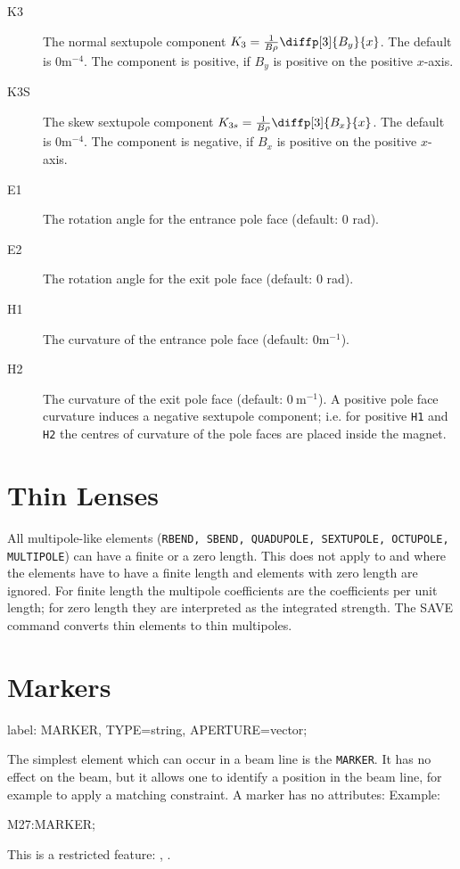 \begin{description}
\item[K3]
  The normal sextupole component
  $K_3=\frac{1}{B \rho}\diffp[3]{B_y}{x}$.
  The default is $0 \mathrm{m}^{-4}$.
  The component is positive, if $B_y$ is positive on the positive $x$-axis.\\
\item[K3S]
  The skew sextupole component
  $K_{3s}=\frac{1}{B \rho}\diffp[3]{B_x}{x}$.
  The default is $0 \mathrm{m}^{-4}$.
  The component is negative, if $B_x$ is positive on the positive $x$-axis.\\
  \item[E1]
  The rotation angle for the entrance pole face
  (default: 0 rad).
\item[E2]
  The rotation angle for the exit pole face
  (default: 0 rad).
\item[H1]
  The curvature of the entrance pole face (default: $0 \mathrm{m}^{-1}$).\\
  \item[H2]
  The curvature of the exit pole face (default: $0~\mathrm{m}^{-1}$).
  A positive pole face curvature induces a negative sextupole component;
  i.e. for positive \texttt{H1} and \texttt{H2}
  the centres of curvature of the pole faces are placed inside the magnet.\\
\end{description}



\section{Thin Lenses}
\label{sec:thin}
All multipole-like elements
(\texttt{RBEND, SBEND, QUADUPOLE, SEXTUPOLE, OCTUPOLE, MULTIPOLE})
can have a finite or a zero length. This does not apply to \opalt and \opalcycl where the elements have to have a finite length and elements with zero length are ignored.
For finite length the multipole coefficients are the coefficients per
unit length;
for zero length they are interpreted as the integrated strength.
The {SAVE} command  converts thin elements to
thin multipoles.

\section{Markers}
\label{sec:marker}
\begin{example}
label: MARKER, TYPE=string, APERTURE=vector;
\end{example}
The simplest element which can occur in a beam line is the \texttt{MARKER}.
It has no effect on the beam,
but it allows one to identify a position in the beam line,
for example to apply a matching constraint.
A marker has no attributes:
\noindent Example:
\begin{example}
M27:MARKER;
\end{example}
This is a restricted feature: \noopalt, \noopalcycl.

